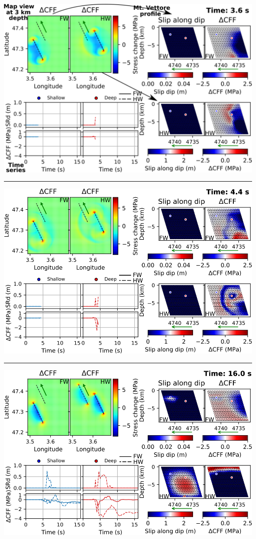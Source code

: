 \begin{poster}
{\begin{minipage}{0.667\linewidth}
\vskip -0.0cm  \vskip 0.1cm
 \includegraphics[width=0.93\linewidth]{images/horizontal_delta_00018_nofix.png}
\vskip 0.2cm
\hrule height 0.05cm
\vskip 0.2cm
\includegraphics[width=0.93\linewidth]{images/horizontal_delta_00022_nofix.png} \\
\vskip 0.2cm
\hrule height 0.05cm
\vskip 0.2cm
\includegraphics[width=0.93\linewidth]{images/horizontal_delta_00080_nofix.png} 

\end{minipage}}
\end{poster}
